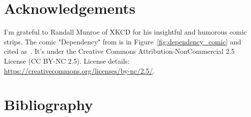 \documentclass[draft]{article}
\newcommand{\getyear}[1]{\citeyear{#1}}
\begin{document}



\section{Acknowledgements}
I'm grateful to Randall Munroe of XKCD for his insightful and humorous comic strips. The comic "Dependency" from \getyear{munroeDependency2020} is in Figure~\ref{fig:dependency_comic} and cited as~\cite{munroeDependency2020}. It's under the Creative Commons Attribution-NonCommercial 2.5 License (CC BY-NC 2.5). License details: \url{https://creativecommons.org/licenses/by-nc/2.5/}.

\printbibliography


\section{Bibliography}
\end{document}
